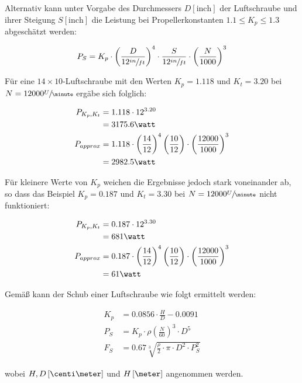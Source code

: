 \bigbreak

Alternativ kann unter Vorgabe des Durchmessers $D \left[\text{inch}\right]$ der Luftschraube und ihrer Steigung $S \left[\text{inch}\right]$ die Leistung bei Propellerkonstanten $1.1 \leq K_p \leq 1.3$ abgeschätzt werden:

\begin{align}
	P_S = K_p \cdot \left(\frac{D}{12 \sfrac{in}{ft}}\right)^4 \cdot \frac{S}{12 \sfrac{in}{ft}} \cdot \left(\frac{N}{1000}\right)^3
\end{align}

Für eine $14\times 10$-Luftschraube mit den Werten $K_p = 1.118$ und $K_t = 3.20$ bei $N = 12000 \sfrac{U}{\minute}$  ergäbe sich folglich:

\begin{align}
	P_{K_p,K_t} &= 1.118 \cdot 12^{3.20} \\ &= 3175.6 \watt \notag\\
	P_{approx} &= 1.118 \cdot \left(\frac{14}{12}\right)^4 \left(\frac{10}{12}\right) \cdot \left(\frac{12000}{1000}\right)^3 \\ &= 2982.5 \watt \notag
\end{align}

Für kleinere Werte von $K_p$ weichen die Ergebnisse jedoch stark voneinander ab, so dass das Beispiel $K_p = 0.187$ und $K_t = 3.30$ bei $N = 12000 \sfrac{U}{\minute}$  nicht funktioniert:

\begin{align}
	P_{K_p,K_t} &= 0.187 \cdot 12^{3.30} \\ &= 681 \watt \notag\\
	P_{approx} &= 0.187 \cdot \left(\frac{14}{12}\right)^4 \left(\frac{10}{12}\right) \cdot \left(\frac{12000}{1000}\right)^3 \\ &= 61 \watt \notag
\end{align}

\bigbreak

Gemäß \cite{standschub} kann der Schub einer Luftschraube wie folgt ermittelt werden:

\begin{align}
	K_p &= 0.0856 \cdot \frac{H}{D} - 0.0091 \\
	P_S &= K_p \cdot \rho \left(\frac{N}{60}\right)^3 \cdot D^5 \\
	F_S &= 0.67 \sqrt[3]{\frac{\rho}{2}\cdot\pi \cdot D^2 \cdot P_S^2}
\end{align}

wobei $H,D \left[\centi\meter\right]$ und $H \left[\meter\right]$ angenommen werden.

